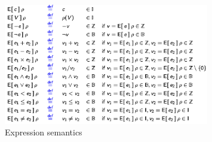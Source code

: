 \documentclass[toc]{../cs-classes/cs-classes}
\begin{document}
\begin{figure}[H]
    \centering
    \includegraphics[width=0.8\textwidth]{images/expression-semantics.png}
    \caption{Expression semantics}
\end{figure}
\end{document}
